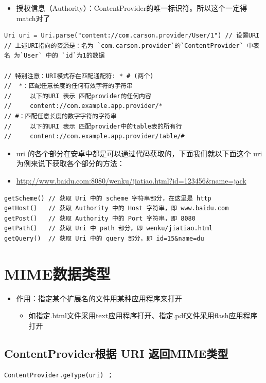 \documentclass[9pt, b5paaper]{book}
\begin{document}
\begin{itemize}
\item 授权信息（Authority）：ContentProvider的唯一标识符。所以这个一定得match对了
\end{itemize}
\begin{verbatim}
Uri uri = Uri.parse("content://com.carson.provider/User/1") // 设置URI
// 上述URI指向的资源是：名为 `com.carson.provider`的`ContentProvider` 中表名 为`User` 中的 `id`为1的数据

// 特别注意：URI模式存在匹配通配符: * # (两个)
//  *：匹配任意长度的任何有效字符的字符串
//     以下的URI 表示 匹配provider的任何内容
//     content://com.example.app.provider/* 
// #：匹配任意长度的数字字符的字符串
//     以下的URI 表示 匹配provider中的table表的所有行
//     content://com.example.app.provider/table/#
\end{verbatim}
\begin{itemize}
\item uri 的各个部分在安卓中都是可以通过代码获取的，下面我们就以下面这个 uri 为例来说下获取各个部分的方法：
\item \url{http://www.baidu.com:8080/wenku/jiatiao.html?id=123456&name=jack}
\end{itemize}
\begin{verbatim}
getScheme() // 获取 Uri 中的 scheme 字符串部分，在这里是 http
getHost()   // 获取 Authority 中的 Host 字符串，即 www.baidu.com
getPost()   // 获取 Authority 中的 Port 字符串，即 8080
getPath()   // 获取 Uri 中 path 部分，即 wenku/jiatiao.html
getQuery()  // 获取 Uri 中的 query 部分，即 id=15&name=du
\end{verbatim}

\section{MIME数据类型}
\label{sec-5-2}
\begin{itemize}
\item 作用：指定某个扩展名的文件用某种应用程序来打开
\begin{itemize}
\item 如指定.html文件采用text应用程序打开、指定.pdf文件采用flash应用程序打开
\end{itemize}
\end{itemize}

\subsection{ContentProvider根据 URI 返回MIME类型}
\label{sec-5-2-1}
\begin{verbatim}
ContentProvider.geType(uri) ；
\end{verbatim}
\end{document}
